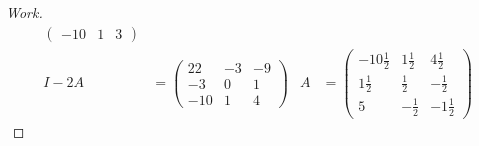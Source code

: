 \documentclass{article}
\begin{document}
\begin{proof}[Work]
\begin{align*}
\begin{pmatrix}
                                                           -10 & 1  & 3
                                                       \end{pmatrix}                            \\
        I - 2A        & = \begin{pmatrix}
                              22  & -3 & -9 \\
                              -3  & 0  & 1  \\
                              -10 & 1  & 4
                          \end{pmatrix}  & A   & = \begin{pmatrix}
                                                       -10\frac{1}{2} & 1\frac{1}{2} & 4\frac{1}{2}  \\
                                                       1\frac{1}{2}   & \frac{1}{2}  & -\frac{1}{2}  \\
                                                       5              & -\frac{1}{2} & -1\frac{1}{2}
                                                   \end{pmatrix}
    \end{align*}
\end{proof}
\qdash
\end{document}
